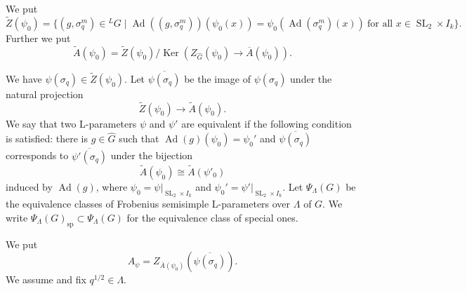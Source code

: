 \documentclass[12pt,a4paper]{article}
\DeclareMathOperator{\Ker}{Ker}
\DeclareMathOperator{\Ad}{Ad}
\DeclareMathOperator{\SL}{SL}
\newcommand{\mr}{\mathrm}
\newcommand{\ol}{\overline}
\newcommand{\wh}{\widehat}
\begin{document}
We put 
\begin{equation}
 \widetilde{Z}(\psi_0)=\{ (g,\sigma_q^m) \in {}^{L}G \mid 
 \Ad ((g,\sigma_q^m))(\psi_0 (x))=\psi_0 (\Ad (\sigma_q^m)(x)) \ \textrm{for all $x \in \SL_2 \times I_k$}
 \}. 
\end{equation}
Further we put 
\begin{equation}
 \widetilde{A}(\psi_0)=\widetilde{Z}(\psi_0) / 
 \Ker (Z_{\wh{G}}(\psi_0) \to \ol{A}(\psi_0)). 
\end{equation}

We have 
$\psi (\sigma_q) \in \widetilde{Z}(\psi_0)$. 
Let $\ol{\psi (\sigma_q)}$ be the image of 
$\psi (\sigma_q)$ under the natural projection 
\[
 \widetilde{Z}(\psi_0) \to 
 \widetilde{A}(\psi_0). 
\]
We say that two 
L-parameters $\psi$ and $\psi'$ are equivalent 
if the following condition is satisfied: 
there is $g \in \wh{G}$ such that 
$\Ad (g)(\psi_0)=\psi_0'$ and 
$\ol{\psi (\sigma_q)}$ corresponds to 
$\ol{\psi' (\sigma_q)}$ under the bijection 
\[
 \widetilde{A}(\psi_0) \cong 
 \widetilde{A}(\psi'_0) 
\]
induced by $\Ad (g)$, where 
$\psi_0=\psi|_{\SL_2 \times I_k}$ and 
$\psi_0'=\psi'|_{\SL_2 \times I_k}$. 
Let $\Psi_{\Lambda}(G)$ be the equivalence classes of 
Frobenius semisimple L-parameters over $\Lambda$ of $G$. 
We write $\Psi_{\Lambda}(G)_{\mr{sp}} \subset \Psi_{\Lambda}(G)$ for 
the equivalence class of special ones. 

We put 
\begin{equation}
A_{\psi} = Z_{\ol{A}(\psi_0)} (\ol{\psi (\sigma_q)}) . 
\end{equation} 
We assume and fix $q^{1/2} \in \Lambda$. 
\end{document}
